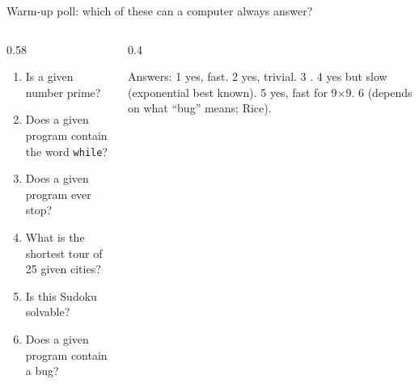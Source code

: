\begin{frame}{Warm-up poll: which of these can a computer always answer?}
\begin{columns}[T]
\begin{column}{0.58\textwidth}
\begin{enumerate}\setlength\itemsep{3mm}
\item Is a given number prime?
\item Does a given program contain the word \texttt{while}?
\item Does a given program ever stop?
\item What is the shortest tour of 25 given cities?
\item Is this Sudoku solvable?
\item Does a given program contain a bug?
\end{enumerate}
\end{column}
\begin{column}{0.4\textwidth}
\vspace{2mm}

{\footnotesize Answers: 1 yes, fast. 2 yes, trivial. 3 . 4 yes but slow (exponential best known). 5 yes, fast for 9$\times$9. 6  (depends on what ``bug'' means; Rice).}
\end{column}
\end{columns}
\end{frame}
